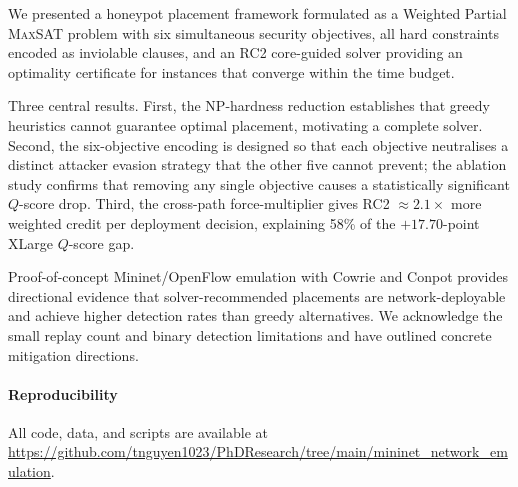 \documentclass[journal]{IEEEtran}
\newcommand{\MAXSAT}{\textsc{MaxSAT}}
\newcommand{\qscore}{$Q$-score}
\begin{document}
We presented a honeypot placement framework formulated as a Weighted
Partial \MAXSAT{} problem with six simultaneous security objectives,
all hard constraints encoded as inviolable clauses, and an RC2
core-guided solver providing an optimality certificate for instances
that converge within the time budget.

Three central results. First, the NP-hardness reduction establishes
that greedy heuristics cannot guarantee optimal placement, motivating
a complete solver. Second, the six-objective encoding is designed so
that each objective neutralises a distinct attacker evasion strategy
that the other five cannot prevent; the ablation study confirms that
removing any single objective causes a statistically significant
\qscore{} drop. Third, the cross-path force-multiplier gives RC2
${\approx}2.1\times$ more weighted credit per deployment decision,
explaining 58\% of the $+17.70$-point XLarge \qscore{} gap.

Proof-of-concept Mininet/OpenFlow emulation with Cowrie and Conpot
provides directional evidence that solver-recommended placements are
network-deployable and achieve higher detection rates than greedy
alternatives. We acknowledge the small replay count and binary
detection limitations and have outlined concrete mitigation directions.

\paragraph{Reproducibility}
All code, data, and scripts are available at\\
\url{https://github.com/tnguyen1023/PhDResearch/tree/main/mininet_network_emulation}.
\end{document}
